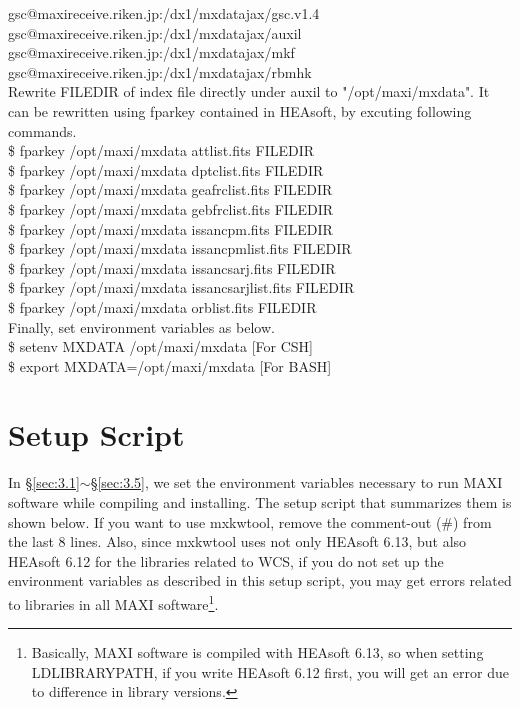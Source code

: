\documentclass[10pt]{report}
\makeatletter
\renewcommand{\_}{\textscale{.5}{\textbf{\textunderscore}}}
\newcommand{\at}{\makeatletter @\makeatother}
\makeatother
\begin{document}
\noindent gsc\at maxireceive.riken.jp:/dx1/mxdata\_jax/gsc.v1.4 \\
gsc\at maxireceive.riken.jp:/dx1/mxdata\_jax/auxil \\
gsc\at maxireceive.riken.jp:/dx1/mxdata\_jax/mkf \\
gsc\at maxireceive.riken.jp:/dx1/mxdata\_jax/rbmhk \\

\noindent Rewrite FILEDIR of index file directly under auxil to "/opt/maxi/mxdata". It can be rewritten using fparkey contained in HEAsoft, by excuting following commands.\\

\noindent \$ fparkey /opt/maxi/mxdata attlist.fits FILEDIR\\
\$ fparkey /opt/maxi/mxdata dptclist.fits FILEDIR\\
\$ fparkey /opt/maxi/mxdata geafrclist.fits FILEDIR\\
\$ fparkey /opt/maxi/mxdata gebfrclist.fits FILEDIR\\
\$ fparkey /opt/maxi/mxdata issancpm.fits FILEDIR\\
\$ fparkey /opt/maxi/mxdata issancpmlist.fits FILEDIR\\
\$ fparkey /opt/maxi/mxdata issancsarj.fits FILEDIR\\
\$ fparkey /opt/maxi/mxdata issancsarjlist.fits FILEDIR\\
\$ fparkey /opt/maxi/mxdata orblist.fits FILEDIR\\

\noindent Finally, set environment variables as below.\\

\noindent \$ setenv MXDATA /opt/maxi/mxdata  \phantom{aa}[For CSH]\\

\noindent \$ export MXDATA=/opt/maxi/mxdata  \phantom{aa}[For BASH]\\

\section{Setup Script}\label{sec:3.6}

In \S\ref{sec:3.1}$\sim$\S\ref{sec:3.5}, we set the environment variables necessary to run MAXI software while compiling and installing. The setup script that summarizes them is shown below. If you want to use mxkwtool, remove the comment-out (\#) from the last 8 lines. Also, since mxkwtool uses not only HEAsoft 6.13, but also HEAsoft 6.12 for the libraries related to WCS, if you do not set up the environment variables as described in this setup script, you may get errors related to libraries in all MAXI software\footnote{Basically, MAXI software is compiled with HEAsoft 6.13, so when setting LD\_LIBRARY\_PATH, if you write HEAsoft 6.12 first, you will get an error due to difference in library versions.}.\\
\end{document}
